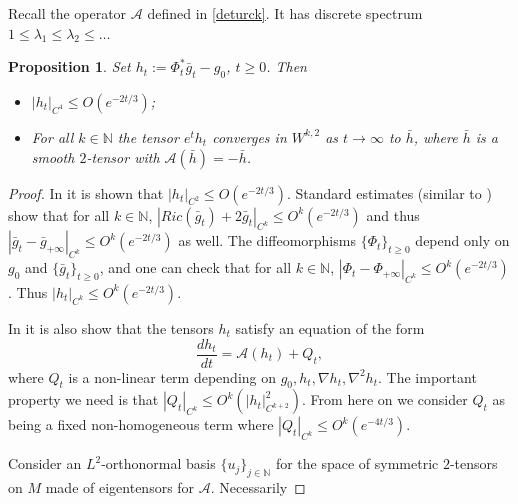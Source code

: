 \documentclass[11pt]{amsart}
\def\N{\mathbb N}
\newtheorem{prop}[thm]{Proposition}
\theoremstyle{remark}
\theoremstyle{definition}
\begin{document}
{{	
	{Recall the operator $\mathcal A$ defined in \eqref{deturck}.} It has discrete spectrum {$1\leq \lambda_1\leq\lambda_2\leq \ldots $} %
	
	
	
	
	\begin{prop}\label{ricci-stable} 
		Set $h_t:=\Phi^*_t\bar g_t-g_0$, $t\geq 0$. Then 
		
		\begin{itemize}
			\item $|h_t|_{C^4}\leq O(e^{-2t/3})$;
			\item  {For all $k\in\N$ the tensor} $e^{t}h_t$ converges in $W^{k,2}$ as $t\to\infty$ to $\bar h$, where $\bar h$ is  a smooth $2$-tensor with $\mathcal A(\bar h)=-\bar h$.
		\end{itemize}
	\end{prop} 
	\begin{proof}
		In \cite{knopf} it is  shown that  $|h_t|_{C^{2}}\leq O(e^{-2t/3})$. Standard estimates (similar to \cite[Lemma 5.3]{haslhofer}) show that for all $k\in\N$, $|Ric(\bar g_t)+2\bar g_t|_{C^{k}}\leq O^{{k}}(e^{-2t/3})$ and thus $|\bar g_t-\bar g_{+\infty}|_{C^{{k}}}\leq O^{{k}}(e^{-2t/3})$ as well.  The diffeomorphisms $\{\Phi_t\}_{t\geq 0}$ depend only on $g_0$ and $\{\bar g_t\}_{t\geq 0}$, and one can check that for all $k\in\N$, $|\Phi_t-\Phi_{+\infty}|_{C^{k}}\leq O^{{k}}(e^{-2t/3})$. Thus  $|h_t|_{C^{{k}}}\leq O^{{k}}(e^{-2t/3})$.
		
		In \cite{knopf} it is  also show that the tensors $h_t$  satisfy  an equation of the form
		$$\frac{dh_t}{dt}=\mathcal A(h_t)+ Q_t,$$
		where $Q_t$ is a non-linear term depending on $g_0, h_t, \nabla h_t,\nabla^2h_t$.  The important property we need is that $|Q_t|_{C^k}\leq O^{{k}}(|h_t|_{C^{k+2}}^2)$. From here on we consider $Q_t$ as being a fixed non-homogeneous term where $|Q_t|_{C^{{k}}}\leq O^{{k}}(e^{-4t/3})$.
		
		Consider an  $L^2$-orthonormal  basis $\{u_{j}\}_{{j}\in\N}$ for the space of symmetric $2$-tensors on $M$ made of eigentensors for $\mathcal A$. Necessarily
		

\end{proof}}}
\end{document}
